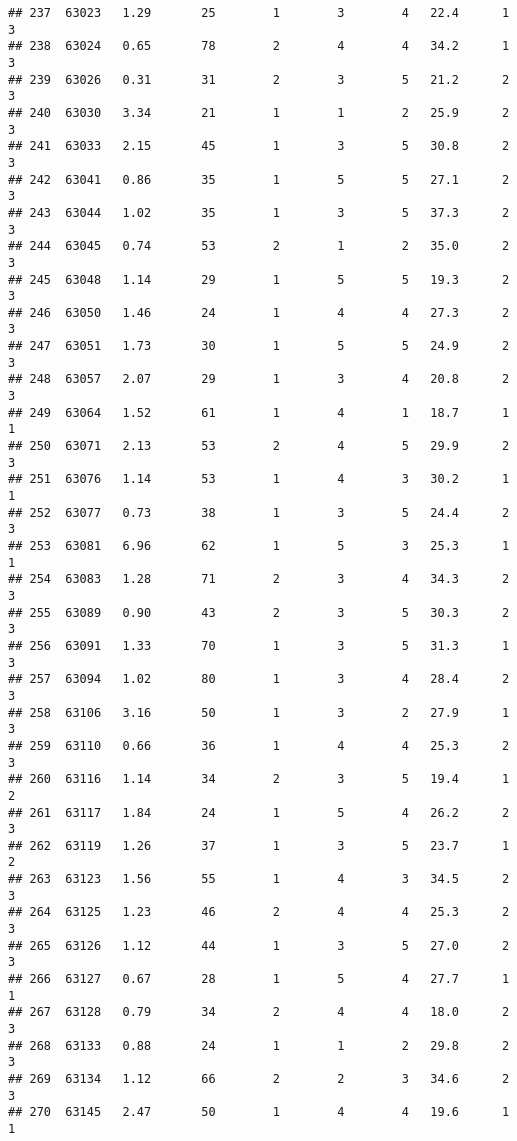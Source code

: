 \documentclass[
]{article}
\begin{document}
\begin{verbatim}
## 237  63023   1.29       25        1        3        4   22.4      1      3
## 238  63024   0.65       78        2        4        4   34.2      1      3
## 239  63026   0.31       31        2        3        5   21.2      2      3
## 240  63030   3.34       21        1        1        2   25.9      2      3
## 241  63033   2.15       45        1        3        5   30.8      2      3
## 242  63041   0.86       35        1        5        5   27.1      2      3
## 243  63044   1.02       35        1        3        5   37.3      2      3
## 244  63045   0.74       53        2        1        2   35.0      2      3
## 245  63048   1.14       29        1        5        5   19.3      2      3
## 246  63050   1.46       24        1        4        4   27.3      2      3
## 247  63051   1.73       30        1        5        5   24.9      2      3
## 248  63057   2.07       29        1        3        4   20.8      2      3
## 249  63064   1.52       61        1        4        1   18.7      1      1
## 250  63071   2.13       53        2        4        5   29.9      2      3
## 251  63076   1.14       53        1        4        3   30.2      1      1
## 252  63077   0.73       38        1        3        5   24.4      2      3
## 253  63081   6.96       62        1        5        3   25.3      1      1
## 254  63083   1.28       71        2        3        4   34.3      2      3
## 255  63089   0.90       43        2        3        5   30.3      2      3
## 256  63091   1.33       70        1        3        5   31.3      1      3
## 257  63094   1.02       80        1        3        4   28.4      2      3
## 258  63106   3.16       50        1        3        2   27.9      1      3
## 259  63110   0.66       36        1        4        4   25.3      2      3
## 260  63116   1.14       34        2        3        5   19.4      1      2
## 261  63117   1.84       24        1        5        4   26.2      2      3
## 262  63119   1.26       37        1        3        5   23.7      1      2
## 263  63123   1.56       55        1        4        3   34.5      2      3
## 264  63125   1.23       46        2        4        4   25.3      2      3
## 265  63126   1.12       44        1        3        5   27.0      2      3
## 266  63127   0.67       28        1        5        4   27.7      1      1
## 267  63128   0.79       34        2        4        4   18.0      2      3
## 268  63133   0.88       24        1        1        2   29.8      2      3
## 269  63134   1.12       66        2        2        3   34.6      2      3
## 270  63145   2.47       50        1        4        4   19.6      1      1

\end{verbatim}
\end{document}
